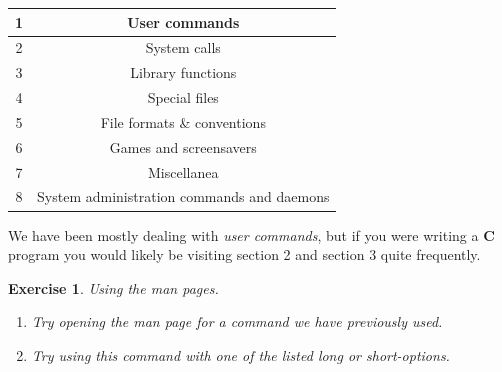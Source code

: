 \documentclass[oneside]{book}
\newtheorem{ex}{Exercise}[chapter]
\begin{document}
\begin{center}
    \begin{tabular}{|c|c|}
        \hline
	    1 & User commands \\
	    \hline
        2 & System calls \\
        \hline
        3 & Library functions \\
        \hline
        4 & Special files \\
        \hline
        5 & File formats \& conventions \\
        \hline
        6 & Games and screensavers \\
        \hline
        7 & Miscellanea \\
        \hline
        8 & System administration commands and daemons \\
        \hline
    \end{tabular}
\end{center}

We have been mostly dealing with \textit{user commands}, but if you were writing a \textbf{C} program you would likely be visiting section 2 and section 3 quite frequently.\\

\begin{ex} Using the man pages.
    \begin{enumerate}
        \item Try opening the man page for a command we have previously used.
        \item Try using this command with one of the listed long or short-options. 
    \end{enumerate}
\end{ex}
\end{document}
